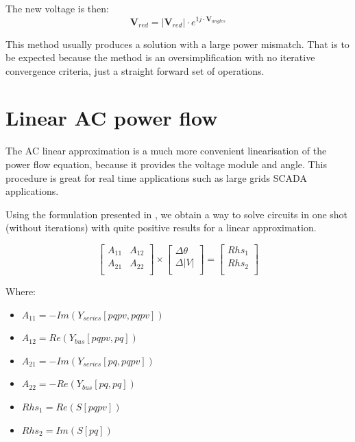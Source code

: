 \documentclass[a4paper,twoside,fleqn]{tufte-book}
\begin{document}
The new voltage is then:
\begin{equation}
\textbf{V}_{red} = |\textbf{V}_{red}| \cdot e^{1j \cdot  \textbf{V}_{angles}}
\end{equation}

This method usually produces a solution with a large power mismatch. That is to be expected because the method is an oversimplification with no iterative convergence criteria, just a straight forward set of operations.


\section{Linear AC power flow}

The AC linear approximation is a much more convenient linearisation of the power flow equation, because it provides the voltage module and angle. This procedure is great for real time applications such as large grids SCADA applications.

Using the formulation presented in \cite{rossoni2016linearized}, we obtain a way to solve circuits in one shot (without iterations) with quite positive results for a linear approximation.

\begin{equation}
\begin{bmatrix}
A_{11} & A_{12} \\
A_{21} & A_{22} \\
\end{bmatrix}
\times
\begin{bmatrix}
\Delta \theta\\
\Delta |V|\\
\end{bmatrix}
=
\begin{bmatrix}
Rhs_1\\
Rhs_2\\
\end{bmatrix}
\end{equation}

Where:
\begin{itemize}
	\item $A_{11} = -Im\left(Y_{series}[pqpv, pqpv]\right)$
	\item $A_{12} = Re\left(Y_{bus}[pqpv, pq]\right)$
	\item $A_{21} = -Im\left(Y_{series}[pq, pqpv]\right)$
	\item $A_{22} = -Re\left(Y_{bus}[pq, pq]\right)$
	\item $Rhs_1 = Re(S[pqpv])$
	\item $Rhs_2 = Im(S[pq])$\newline
\end{itemize}
\end{document}
